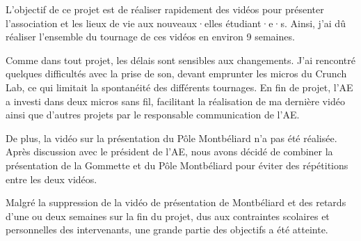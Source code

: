 L'objectif de ce projet est de réaliser rapidement des vidéos pour présenter l'association et les lieux de vie aux nouveaux·elles étudiant·e·s.
Ainsi, j'ai dû réaliser l'ensemble du tournage de ces vidéos en environ 9 semaines.

Comme dans tout projet, les délais sont sensibles aux changements.
J'ai rencontré quelques difficultés avec la prise de son, devant emprunter les micros du Crunch Lab, ce qui limitait la spontanéité des différents tournages.
En fin de projet, l'\gls{AE} a investi dans deux micros sans fil, facilitant la réalisation de ma dernière vidéo ainsi que d'autres projets par le responsable communication de l'\gls{AE}.

De plus, la vidéo sur la présentation du Pôle Montbéliard n'a pas été réalisée.
Après discussion avec le président de l'\gls{AE}, nous avons décidé de combiner la présentation de la Gommette et du Pôle Montbéliard pour éviter des répétitions entre les deux vidéos.

Malgré la suppression de la vidéo de présentation de Montbéliard et des retards d'une ou deux semaines sur la fin du projet, dus aux contraintes scolaires et personnelles des intervenants, une grande partie des objectifs a été atteinte.
